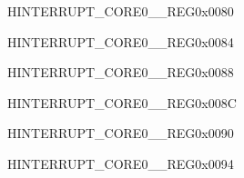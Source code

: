 \begin{register}{H}{INTERRUPT\_CORE0\_\_REG}{0x0080}\label{regdesc:INTERRUPTCORE0TGT0INTMAPREG}






\end{register}\vspace{-3em}


\begin{register}{H}{INTERRUPT\_CORE0\_\_REG}{0x0084}\label{regdesc:INTERRUPTCORE0TGWDTINTMAPREG}






\end{register}\vspace{-3em}


\begin{register}{H}{INTERRUPT\_CORE0\_\_REG}{0x0088}\label{regdesc:INTERRUPTCORE0TG1T0INTMAPREG}






\end{register}\vspace{-3em}


\begin{register}{H}{INTERRUPT\_CORE0\_\_REG}{0x008C}\label{regdesc:INTERRUPTCORE0TG1WDTINTMAPREG}






\end{register}\vspace{-3em}


\begin{register}{H}{INTERRUPT\_CORE0\_\_REG}{0x0090}\label{regdesc:INTERRUPTCORE0CACHEIAINTMAPREG}






\end{register}\vspace{-3em}


\begin{register}{H}{INTERRUPT\_CORE0\_\_REG}{0x0094}\label{regdesc:INTERRUPTCORE0SYSTIMERTARGET0INTMAPREG}






\end{register}\vspace{-3em}


